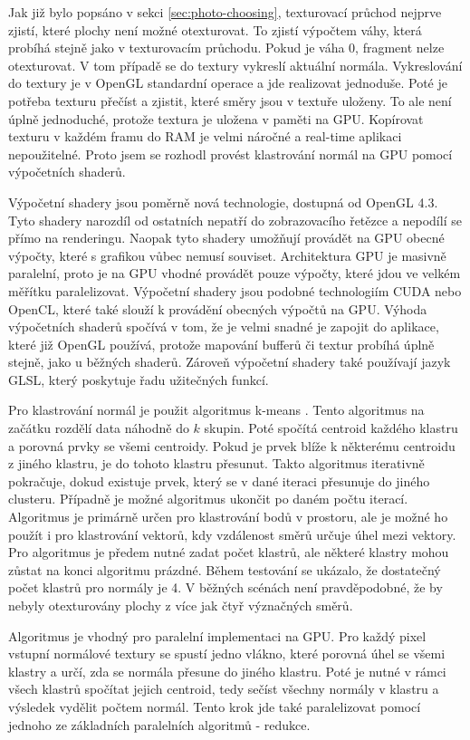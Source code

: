 \documentclass[11pt,twoside,a4paper]{book}
\begin{document}
Jak již bylo popsáno v sekci \ref{sec:photo-choosing}, texturovací průchod nejprve zjistí, které plochy není možné otexturovat. To zjistí výpočtem váhy, která probíhá stejně jako v texturovacím průchodu. Pokud je váha 0, fragment nelze otexturovat. V tom případě se do textury vykreslí aktuální normála. Vykreslování do textury je v OpenGL standardní operace a jde realizovat jednoduše. Poté je potřeba texturu přečíst a zjistit, které směry jsou v textuře uloženy. To ale není úplně jednoduché, protože textura je uložena v paměti na GPU. Kopírovat texturu v každém framu do RAM je velmi náročné a real-time aplikaci nepoužitelné. Proto jsem se rozhodl provést klastrování normál na GPU pomocí výpočetních shaderů.

Výpočetní shadery jsou poměrně nová technologie, dostupná od OpenGL 4.3. Tyto shadery narozdíl od ostatních nepatří do zobrazovacího řetězce a nepodílí se přímo na renderingu. Naopak tyto shadery umožňují provádět na GPU obecné výpočty, které s grafikou vůbec nemusí souviset. Architektura GPU je masivně paralelní, proto je na GPU vhodné provádět pouze výpočty, které jdou ve velkém měřítku paralelizovat. Výpočetní shadery jsou podobné technologiím CUDA nebo OpenCL, které také slouží k provádění obecných výpočtů na GPU. Výhoda výpočetních shaderů spočívá v tom, že je velmi snadné je zapojit do aplikace, které již OpenGL používá, protože mapování bufferů či textur probíhá úplně stejně, jako u běžných shaderů. Zároveň výpočetní shadery také používají jazyk GLSL, který poskytuje řadu užitečných funkcí. 

Pro klastrování normál je použit algoritmus k-means \cite{Lloyd82}. Tento algoritmus na začátku rozdělí data náhodně do $k$ skupin. Poté spočítá centroid každého klastru a porovná prvky se všemi centroidy. Pokud je prvek blíže k některému centroidu z jiného klastru, je do tohoto klastru přesunut. Takto algoritmus iterativně pokračuje, dokud existuje prvek, který se v dané iteraci přesunuje do jiného clusteru. Případně je možné algoritmus ukončit po daném počtu iterací. Algoritmus je primárně určen pro klastrování bodů v prostoru, ale je možné ho použít i pro klastrování vektorů, kdy vzdálenost směrů určuje úhel mezi vektory. Pro algoritmus je předem nutné zadat počet klastrů, ale některé klastry mohou zůstat na konci algoritmu prázdné. Během testování se ukázalo, že dostatečný počet klastrů pro normály je 4. V běžných scénách není pravděpodobné, že by nebyly otexturovány plochy z více jak čtyř význačných směrů.

Algoritmus je vhodný pro paralelní implementaci na GPU. Pro každý pixel vstupní normálové textury se spustí jedno vlákno, které porovná úhel se všemi klastry a určí, zda se normála přesune do jiného klastru. Poté je nutné v rámci všech klastrů spočítat jejich centroid, tedy sečíst všechny normály v klastru a výsledek vydělit počtem normál. Tento krok jde také paralelizovat pomocí jednoho ze základních paralelních algoritmů - redukce.
\end{document}
